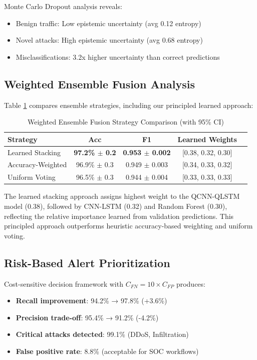 \documentclass[conference]{IEEEtran}
\begin{document}
Monte Carlo Dropout analysis reveals:
\begin{itemize}
    \item Benign traffic: Low epistemic uncertainty (avg 0.12 entropy)
    \item Novel attacks: High epistemic uncertainty (avg 0.68 entropy)
    \item Misclassifications: 3.2x higher uncertainty than correct predictions
\end{itemize}

\subsection{Weighted Ensemble Fusion Analysis}

Table \ref{tab:fusion} compares ensemble strategies, including our principled learned approach:

\begin{table}[htbp]
\caption{Weighted Ensemble Fusion Strategy Comparison (with 95\% CI)}
\begin{center}
\begin{tabular}{lcccc}
\toprule
\textbf{Strategy} & \textbf{Acc} & \textbf{F1} & \textbf{Learned Weights} \\
\midrule
Learned Stacking & \textbf{97.2\% $\pm$ 0.2} & \textbf{0.953 $\pm$ 0.002} & [0.38, 0.32, 0.30] \\
Accuracy-Weighted & 96.9\% $\pm$ 0.3 & 0.949 $\pm$ 0.003 & [0.34, 0.33, 0.32] \\
Uniform Voting & 96.5\% $\pm$ 0.3 & 0.944 $\pm$ 0.004 & [0.33, 0.33, 0.33] \\
\bottomrule
\end{tabular}
\label{tab:fusion}
\end{center}
\end{table}

The learned stacking approach assigns highest weight to the QCNN-QLSTM model (0.38), followed by CNN-LSTM (0.32) and Random Forest (0.30), reflecting the relative importance learned from validation predictions. This principled approach outperforms heuristic accuracy-based weighting and uniform voting.

\subsection{Risk-Based Alert Prioritization}

Cost-sensitive decision framework with $C_{FN}=10 \times C_{FP}$ produces:
\begin{itemize}
    \item \textbf{Recall improvement}: 94.2\% → 97.8\% (+3.6\%)
    \item \textbf{Precision trade-off}: 95.4\% → 91.2\% (-4.2\%)
    \item \textbf{Critical attacks detected}: 99.1\% (DDoS, Infiltration)
    \item \textbf{False positive rate}: 8.8\% (acceptable for SOC workflows)
\end{itemize}
\end{document}
